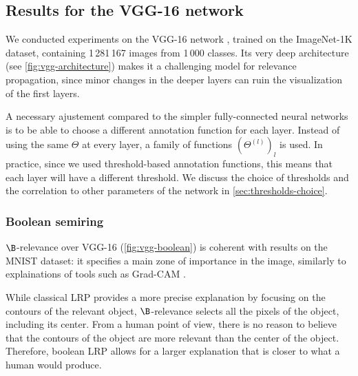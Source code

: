 \documentclass[twocolumn]{../cs-classes/cs-classes}
\newcommand*{\1}{\digitsbb{1}}
\newcommand*{\0}{\digitsbb{0}}
\begin{document}
\subsection{Results for the VGG-16 network}
We conducted experiments on the VGG-16 network \cite{vgg}, trained on the ImageNet-1K dataset, containing 1\,281\,167 images from 1\,000 classes. Its very deep architecture (see \autoref{fig:vgg-architecture}) makes it a challenging model for relevance propagation, since minor changes in the deeper layers can ruin the visualization of the first layers.

A necessary ajustement compared to the simpler fully-connected neural networks is to be able to choose a different annotation function for each layer. Instead of using the same $\Theta$ at every layer, a family of functions $(\Theta^{(l)})_l$ is used. In practice, since we used threshold-based annotation functions, this means that each layer will have a different threshold. We discuss the choice of thresholds and the correlation to other parameters of the network in \autoref{sec:thresholds-choice}.

\subsubsection{Boolean semiring}
$\B$-relevance over VGG-16 (\autoref{fig:vgg-boolean}) is coherent with results on the MNIST dataset: it specifies a main zone of importance in the image, similarly to explainations of tools such as Grad-CAM \cite{gradcam}.

While classical LRP provides a more precise explanation by focusing on the contours of the relevant object, $\B$-relevance selects all the pixels of the object, including its center. From a human point of view, there is no reason to believe that the contours of the object are more relevant than the center of the object. Therefore, boolean LRP allows for a larger explanation that is closer to what a human would produce.
\end{document}
